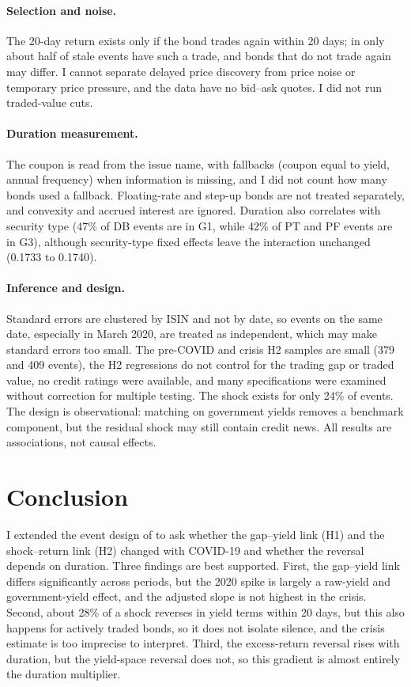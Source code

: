 \documentclass[a4paper,11pt]{article}
\begin{document}
\paragraph{Selection and noise.} The 20-day return exists only if the bond trades again within 20 days; in \cite{kumar2026delayed} only about half of stale events have such a trade, and bonds that do not trade again may differ. I cannot separate delayed price discovery from price noise or temporary price pressure, and the data have no bid--ask quotes. I did not run traded-value cuts.

\paragraph{Duration measurement.} The coupon is read from the issue name, with fallbacks (coupon equal to yield, annual frequency) when information is missing, and I did not count how many bonds used a fallback. Floating-rate and step-up bonds are not treated separately, and convexity and accrued interest are ignored. Duration also correlates with security type (47\% of DB events are in G1, while 42\% of PT and PF events are in G3), although security-type fixed effects leave the interaction unchanged (0.1733 to 0.1740).

\paragraph{Inference and design.} Standard errors are clustered by ISIN and not by date, so events on the same date, especially in March 2020, are treated as independent, which may make standard errors too small. The pre-COVID and crisis H2 samples are small (379 and 409 events), the H2 regressions do not control for the trading gap or traded value, no credit ratings were available, and many specifications were examined without correction for multiple testing. The shock exists for only 24\% of events. The design is observational: matching on government yields removes a benchmark component, but the residual shock may still contain credit news. All results are associations, not causal effects.

\section{Conclusion}
I extended the event design of \cite{kumar2026delayed} to ask whether the gap--yield link (H1) and the shock--return link (H2) changed with COVID-19 and whether the reversal depends on duration. Three findings are best supported. First, the gap--yield link differs significantly across periods, but the 2020 spike is largely a raw-yield and government-yield effect, and the adjusted slope is not highest in the crisis. Second, about 28\% of a shock reverses in yield terms within 20 days, but this also happens for actively traded bonds, so it does not isolate silence, and the crisis estimate is too imprecise to interpret. Third, the excess-return reversal rises with duration, but the yield-space reversal does not, so this gradient is almost entirely the duration multiplier.
\end{document}
